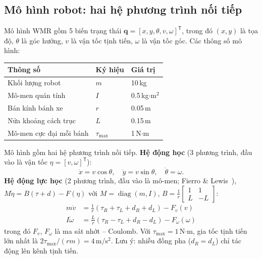 \documentclass[12pt,a4paper]{article}
\newcommand{\T}{\mathsf{T}}
\DeclareMathOperator{\diag}{diag}
\begin{document}
\subsection{Mô hình robot: hai hệ phương trình nối tiếp}

Mô hình WMR gồm 5 biến trạng thái $\mathbf{q} = [x, y, \theta, v, \omega]^\T$, trong đó $(x, y)$ là tọa độ, $\theta$ là góc hướng, $v$ là vận tốc tịnh tiến, $\omega$ là vận tốc góc. Các thông số mô hình:

\begin{center}
\begin{tabular}{lll}
\toprule
\textbf{Thông số} & \textbf{Ký hiệu} & \textbf{Giá trị} \\
\midrule
Khối lượng robot & $m$ & 10\,kg \\
Mô-men quán tính & $I$ & 0.5\,kg$\cdot$m$^2$ \\
Bán kính bánh xe & $r$ & 0.05\,m \\
Nửa khoảng cách trục & $L$ & 0.15\,m \\
Mô-men cực đại mỗi bánh & $\tau_\text{max}$ & 1\,N$\cdot$m \\
\bottomrule
\end{tabular}
\end{center}

Mô hình gồm hai hệ phương trình nối tiếp. \textbf{Hệ động học} (3 phương trình, đầu vào là vận tốc $\eta = [v, \omega]^\T$):
\begin{equation}
    \dot{x} = v\cos\theta, \quad \dot{y} = v\sin\theta, \quad \dot{\theta} = \omega .
\end{equation}
\textbf{Hệ động lực học} (2 phương trình, đầu vào là mô-men; Fierro \& Lewis~\cite{Fierro1997}), $M\dot\eta = B(\tau + d) - F(\eta)$ với $M = \diag(m, I)$, $B = \frac{1}{r}\begin{bmatrix} 1 & 1 \\ L & -L \end{bmatrix}$:
\begin{align}
    m\dot{v} &= \frac{1}{r}(\tau_R + \tau_L + d_R + d_L) - F_v(v) \\
    I\dot{\omega} &= \frac{L}{r}(\tau_R - \tau_L + d_R - d_L) - F_\omega(\omega)
\end{align}
trong đó $F_v$, $F_\omega$ là ma sát nhớt -- Coulomb. Với $\tau_\text{max} = 1$\,N$\cdot$m, gia tốc tịnh tiến lớn nhất là $2\tau_\text{max}/(rm) = 4$\,m/s$^2$. Lưu ý: nhiễu đồng pha ($d_R = d_L$) chỉ tác động lên kênh tịnh tiến.
\end{document}
